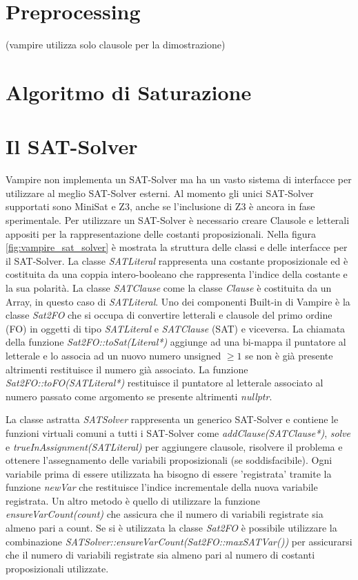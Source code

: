 \documentclass[./main.tex]{subfiles}
\begin{document}
\section{Preprocessing} \label{sec:vampire_preprocessing}
(vampire utilizza solo clausole per la dimostrazione)
\section{Algoritmo di Saturazione} \label{sec:vampire_saturazione}
\section{Il SAT-Solver} \label{sec:vampire_sat}
Vampire non implementa un SAT-Solver ma ha un vasto sistema di interfacce per utilizzare al meglio SAT-Solver esterni.
Al momento gli unici SAT-Solver supportati sono MiniSat e Z3, anche se l'inclusione di Z3 è ancora in fase sperimentale.
Per utilizzare un SAT-Solver è necessario creare Clausole e letterali appositi per la rappresentazione delle costanti proposizionali.
Nella figura \ref{fig:vampire_sat_solver} è mostrata la struttura delle classi e delle interfacce per il SAT-Solver.
La classe \textit{SATLiteral} rappresenta una costante proposizionale ed è costituita da una coppia intero-booleano che rappresenta
l'indice della costante e la sua polarità. 
La classe \textit{SATClause} come la classe \textit{Clause} è costituita da un Array, in questo caso di \textit{SATLiteral}.
Uno dei componenti Built-in di Vampire è la classe \textit{Sat2FO} che si occupa di convertire letterali e clausole 
del primo ordine (FO) in oggetti di tipo \textit{SATLiteral} e \textit{SATClause} (SAT) e viceversa. 
La chiamata della funzione \textit{Sat2FO::toSat(Literal*)} aggiunge ad una bi-mappa il puntatore al letterale
e lo associa ad un nuovo numero unsigned $\geq 1$ se non è già presente altrimenti restituisce il numero già associato.
La funzione \textit{Sat2FO::toFO(SATLiteral*)} restituisce il puntatore al letterale associato al numero passato come argomento
se presente altrimenti \textit{nullptr}.

La classe astratta \textit{SATSolver} rappresenta un generico SAT-Solver e contiene le funzioni virtuali comuni a tutti i SAT-Solver 
come \textit{addClause(SATClause*)}, \textit{solve} e \textit{trueInAssignment(SATLiteral)} per 
aggiungere clausole, risolvere il problema e ottenere l'assegnamento delle variabili proposizionali (se soddisfacibile). 
Ogni variabile prima di essere utilizzata ha bisogno di essere 'registrata' tramite la funzione \textit{newVar} che restituisce
l'indice incrementale della nuova variabile registrata. Un altro metodo è quello di utilizzare la funzione \textit{ensureVarCount(count)} che 
assicura che il numero di variabili registrate sia almeno pari a count.
Se si è utilizzata la classe \textit{Sat2FO} è possibile utilizzare la combinazione \textit{SATSolver::ensureVarCount(Sat2FO::maxSATVar())}
per assicurarsi che il numero di variabili registrate sia almeno pari al numero di costanti proposizionali utilizzate.
\end{document}
